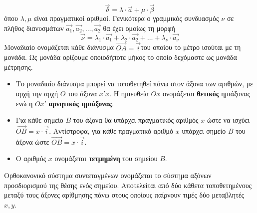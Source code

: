 \documentclass[twoside,nofonts,internet,shmeiwseis]{thewria}
\begin{document}
\[ \vec{\delta}=\lambda\cdot\vec{a}+\mu\cdot\vec{\beta} \] όπου $ \lambda,\mu $ είναι πραγματικοί αριθμοί. Γενικότερα ο γραμμικός συνδυασμός $ \nu $ σε πλήθος διανυσμάτων $ \vec{a_1},\vec{a_2},\ldots,\vec{a_2} $ θα έχει ομοίως τη μορφή
\[ \vec{\nu}=\lambda_1\cdot\vec{a_1}+\lambda_2\cdot\vec{a_2}+\ldots+\lambda_\nu\cdot\vec{a_\nu} \]
Μοναδιαίο ονομάζεται κάθε διάνυσμα $ \overrightarrow{OA}=\vec{i} $του οποίου το μέτρο ισούται με τη μονάδα. Ως μονάδα ορίζουμε οποιοδήποτε μήκος το οποίο δεχόμαστε ως μονάδα μέτρησης.
\begin{center}
\end{center}
\begin{itemize}
\item Το μοναδιαίο διάνυσμα μπορεί να τοποθετηθεί πάνω στον άξονα των αριθμών, με αρχή την αρχή $ O $ του άξονα $ x'x $. Η ημιευθεία $ Ox $ ονομάζεται \textbf{θετικός} ημιάξονας ενώ η $ Ox' $ \textbf{αρνητικός ημιάξονας}.
\item Για κάθε σημείο $ B $ του άξονα θα υπάρχει πραγματικός αριθμός $ x $ ώστε να ισχύει $ \overrightarrow{OB}=x\cdot\vec{i} $. Αντίστροφα, για κάθε πραγματικό αριθμό $ x $ υπάρχει σημείο $ B $ του άξονα ώστε $ \overrightarrow{OB}=x\cdot\vec{i} $.
\item Ο αριθμός $ x $ ονομάζεται \textbf{τετμημένη} του σημείου $ B $.
\end{itemize}
Ορθοκανονικό σύστημα συντεταγμένων ονομάζεται το σύστημα αξόνων προσδιορισμού της θέσης ενός σημείου. Αποτελείται από δύο κάθετα τοποθετημένους μεταξύ τους άξονες αρίθμησης πάνω στους οποίους παίρνουν τιμές δύο μεταβλητές $ x,y $.\\
\end{document}
